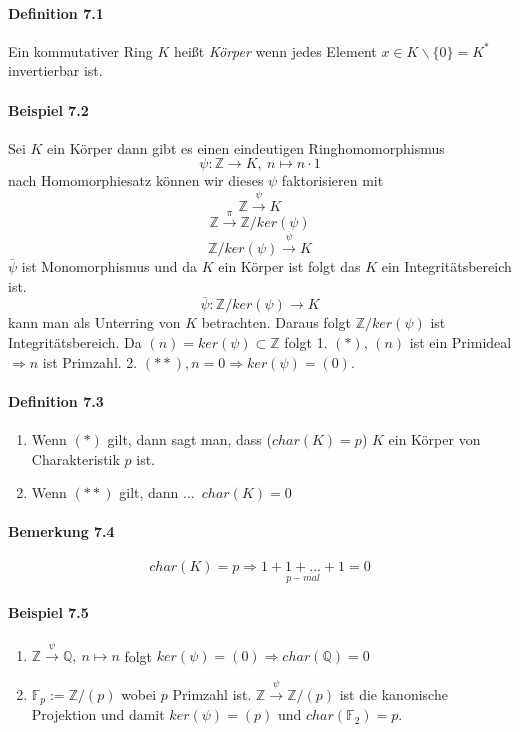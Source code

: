 \documentclass{scrartcl}
\newcommand{\q}[1]{\overline{#1}} %
\newcommand{\us}[2]{\underset{#1}{#2}} %
\newcommand{\os}[2]{\overset{#1}{#2}} %
\newcommand{\Z}{\mathbb{Z}}
\newcommand{\Q}{\mathbb{Q}}
\begin{document}
\paragraph{Definition 7.1}
Ein kommutativer Ring $K$ heißt \textit{Körper} wenn jedes Element $x\in
K\backslash\{0\}=K^*$ invertierbar ist.

\paragraph{Beispiel 7.2}
Sei $K$ ein Körper dann gibt es einen eindeutigen Ringhomomorphismus
\[
  \psi:\Z \to K,~n\mapsto n\cdot 1
\]
nach Homomorphiesatz können wir dieses $\psi$ faktorisieren mit
\[
  \Z \os{\psi}{\to}K
\]
\[
  \Z \os{\pi}{\to}\Z/ker(\psi)
\]
\[
  \Z/ker(\psi)\os{\q{\psi}}{\to}K
\]
$\q{\psi}$ ist Monomorphismus und
da $K$ ein Körper ist folgt das $K$ ein Integritätsbereich ist.
\[
  \q{\psi}:\Z/ker(\psi)\to K
\]
kann man als Unterring von $K$ betrachten. Daraus folgt $\Z/ker(\psi)$ ist
Integritätsbereich. Da $(n)=ker(\psi)\subset\Z$ folgt 1. $(*)$, $(n)$ ist ein
Primideal
$\Rightarrow n$ ist Primzahl. 2. $(**), $$n=0 \Rightarrow ker(\psi)=(0)$.

\paragraph{Definition 7.3}
\begin{enumerate}{}
\item Wenn $(*)$ gilt, dann sagt man, dass ($char(K)=p$) $K$ ein Körper von
Charakteristik $p$ ist.
\item Wenn $(**)$ gilt, dann $\dots$~$char(K)=0$ 
\end{enumerate}

\paragraph{Bemerkung 7.4}
\[
  char(K)=p \Rightarrow \us{p-mal}{1+1+\dots+1}=0
\]

\paragraph{Beispiel 7.5}
\begin{enumerate}{}
\item $\Z \os{\psi}{\to}\Q,~n\mapsto n$ folgt $ker(\psi)=(0) \Rightarrow char(\Q)=0$
\item $\mathbb{F}_p := \Z/(p)$ wobei $p$ Primzahl ist. $\Z\os{\psi}{\to}\Z/(p)$
  ist die kanonische Projektion und damit $ker(\psi)=(p)$ und
  $char(\mathbb{F}_2)=p$.
\end{enumerate}
\end{document}
